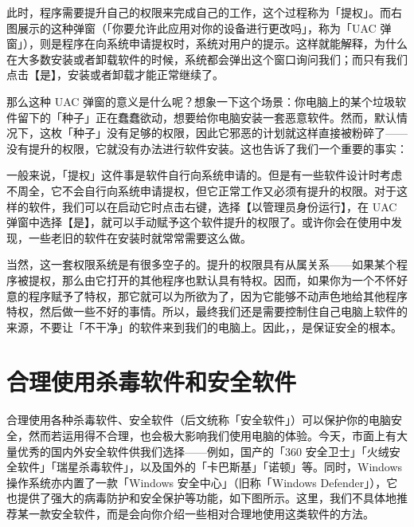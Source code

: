 此时，程序需要提升自己的权限来完成自己的工作，这个过程称为「提权」。而右图展示的这种弹窗（「你要允许此应用对你的设备进行更改吗」，称为「UAC 弹窗」），则是程序在向系统申请提权时，系统对用户的提示。这样就能解释，为什么在大多数安装或者卸载软件的时候，系统都会弹出这个窗口询问我们；而只有我们点击【是】，安装或者卸载才能正常继续了。

那么这种 UAC 弹窗的意义是什么呢？想象一下这个场景：你电脑上的某个垃圾软件留下的「种子」正在蠢蠢欲动，想要给你电脑安装一套恶意软件。然而，默认情况下，这枚「种子」没有足够的权限，因此它邪恶的计划就这样直接被粉碎了——没有提升的权限，它就没有办法进行软件安装。这也告诉了我们一个重要的事实：

一般来说，「提权」这件事是软件自行向系统申请的。但是有一些软件设计时考虑不周全，它不会自行向系统申请提权，但它正常工作又必须有提升的权限。对于这样的软件，我们可以在启动它时点击右键，选择【以管理员身份运行】，在 UAC 弹窗中选择【是】，就可以手动赋予这个软件提升的权限了。或许你会在使用中发现，一些老旧的软件在安装时就常常需要这么做。

当然，这一套权限系统是有很多空子的。提升的权限具有从属关系——如果某个程序被提权，那么由它打开的其他程序也默认具有特权。因而，如果你为一个不怀好意的程序赋予了特权，那它就可以为所欲为了，因为它能够不动声色地给其他程序特权，然后做一些不好的事情。所以，最终我们还是需要控制住自己电脑上软件的来源，不要让「不干净」的软件来到我们的电脑上。因此，，是保证安全的根本。

\section{合理使用杀毒软件和安全软件}

合理使用各种杀毒软件、安全软件（后文统称「安全软件」）可以保护你的电脑安全，然而若运用得不合理，也会极大影响我们使用电脑的体验。今天，市面上有大量优秀的国内外安全软件供我们选择——例如，国产的「360 安全卫士」「火绒安全软件」「瑞星杀毒软件」，以及国外的「卡巴斯基」「诺顿」等。同时，Windows 操作系统亦内置了一款「Windows 安全中心」（旧称「Windows Defender」），它也提供了强大的病毒防护和安全保护等功能，如下图所示。这里，我们不具体地推荐某一款安全软件，而是会向你介绍一些相对合理地使用这类软件的方法。

